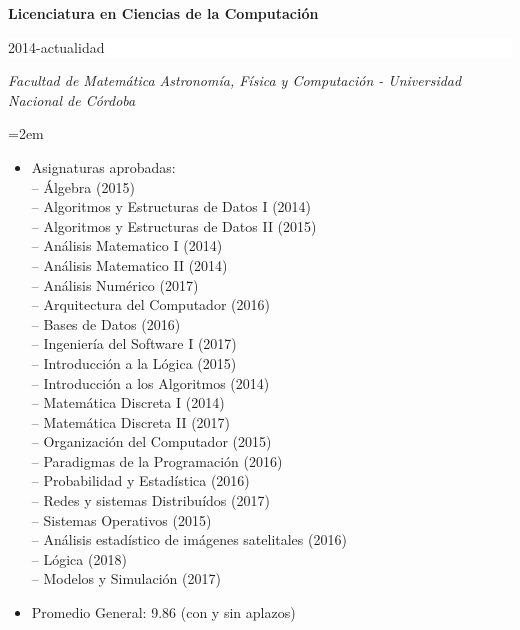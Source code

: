 \documentclass[paper=a4,fontsize=11pt]{scrartcl} %
\newcommand{\EducationEntry}[4]{
		\noindent \textbf{#1} \hfill      %
		\colorbox{White}{%
			\parbox{5cm}{%
			\hfill\color{Black}#2}} \par  %
		\noindent \textit{#3} \par        %
		\noindent\hangindent=2em\hangafter=0 \small #4 %
		\normalsize \par}
\begin{document}
\EducationEntry{Licenciatura en Ciencias de la Computación}{2014-actualidad}{Facultad de Matemática Astronomía, Física y Computación - Universidad Nacional de Córdoba}{
\begin{itemize}

\item{Asignaturas aprobadas:\\
– Álgebra (2015) \\
– Algoritmos y Estructuras de Datos I (2014) \\
– Algoritmos y Estructuras de Datos II (2015) \\
– Análisis Matematico I (2014) \\
– Análisis Matematico II (2014) \\
– Análisis Numérico (2017) \\
– Arquitectura del Computador (2016) \\
– Bases de Datos (2016) \\
– Ingeniería del Software I (2017) \\
– Introducción a la Lógica (2015) \\
– Introducción a los Algoritmos (2014) \\
– Matemática Discreta I (2014) \\
– Matemática Discreta II (2017) \\
– Organización del Computador (2015) \\
– Paradigmas de la Programación (2016) \\
– Probabilidad y Estadística (2016) \\
– Redes y sistemas Distribuídos (2017) \\
– Sistemas Operativos (2015) \\
– Análisis estadístico de imágenes satelitales (2016) \\
– Lógica (2018) \\
– Modelos y Simulación (2017) \\
}
\item{Promedio General: }{}{9.86 (con y sin aplazos)}
\end{itemize}
}


\newpage
\end{document}
